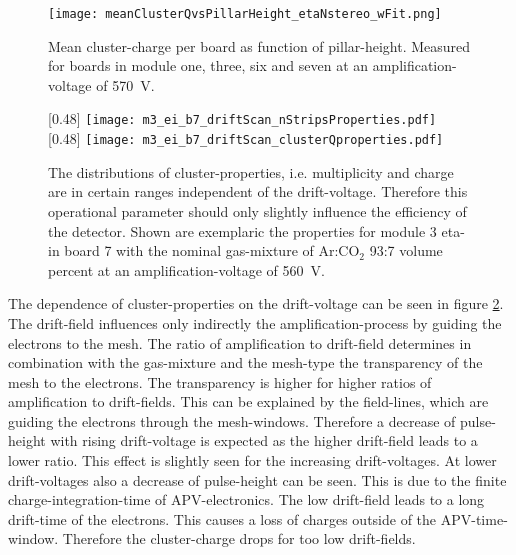 \documentclass[
twoside,            %
BCOR1.4cm,          %
10pt,               %
headings=normal,    %
headsepline,        %
clearplainpage,		%
final,              %
div=14,
open=right,
bibliography=toc
]{scrreprt}
\begin{document}
\begin{figure}[!h]
	\centering
	\texttt{[image: meanClusterQvsPillarHeight\_etaNstereo\_wFit.png]}
	\vspace{-2mm}
	\caption{
		Mean cluster-charge per board as function of pillar-height.
		Measured for boards in module one, three, six and seven at an amplification-voltage of \SI{570}{V}.
	}
	\label{meanClusterQvsPillarHeight} 
\end{figure}

\begin{figure}[!h]
	\centering
	[0.48\textwidth]
	{\texttt{[image: m3\_ei\_b7\_driftScan\_nStripsProperties.pdf]}}
	\hfill
	[0.48\textwidth]
	{\texttt{[image: m3\_ei\_b7\_driftScan\_clusterQproperties.pdf]}}
	\vspace{-3mm}
	\caption{
		The distributions of cluster-properties, i.e. multiplicity and charge are in certain ranges independent of the drift-voltage.
		Therefore this operational parameter should only slightly influence the efficiency of the detector.
		Shown are exemplaric the properties for module 3 eta-in board 7 with the nominal gas-mixture of Ar:CO$_{2}$ 93:7 volume percent at an amplification-voltage of \SI{560}{V}.
	}
	\label{m3_ei_b7_driftScan_clusterProperties} 
\end{figure}

The dependence of cluster-properties on the drift-voltage can be seen in figure \ref{m3_ei_b7_driftScan_clusterProperties}.
The drift-field influences only indirectly the amplification-process by guiding the electrons to the mesh.
The ratio of amplification to drift-field determines in combination with the gas-mixture and the mesh-type the transparency of the mesh to the electrons.
The transparency is higher for higher ratios of amplification to drift-fields.
This can be explained by the field-lines, which are guiding the electrons through the mesh-windows.
Therefore a decrease of pulse-height with rising drift-voltage is expected as the higher drift-field leads to a lower ratio.
This effect is slightly seen for the increasing drift-voltages.
At lower drift-voltages also a decrease of pulse-height can be seen.
This is due to the finite charge-integration-time of APV-electronics.
The low drift-field leads to a long drift-time of the electrons.
This causes a loss of charges outside of the APV-time-window.
Therefore the cluster-charge drops for too low drift-fields.
\end{document}

